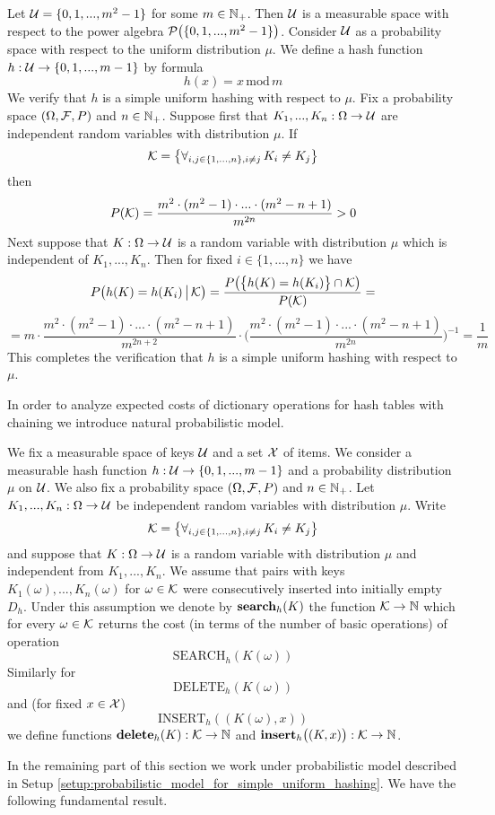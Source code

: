 \begin{example}\label{example:interval_of_integers_with_modulo_hash_function_as_an_example_of_suh}
Let ${\mathcal U} = \{0,1,...,m^2-1\}$ for some $m\in {\mathbb N}_+$. Then ${\mathcal U}$ is a measurable space with respect to the power algebra ${\mathcal P}\big(\{0,1,...,m^2-1\}\big)$. Consider ${\mathcal U}$ as a probability space with respect to the uniform distribution $\mu$. We define a hash function $h:{\mathcal U} \rightarrow \{0,1,...,m-1\}$ by formula
$$h(x) = x\,\mathrm{mod}\,m$$
We verify that $h$ is a simple uniform hashing with respect to $\mu$. Fix a probability space $(\Omega,{\mathcal F},P)$ and $n\in {\mathbb N}_+$. Suppose first that $K_1,...,K_n:\Omega\rightarrow {\mathcal U}$ are independent random variables with distribution $\mu$. If 
$${\mathcal K} =\big\{\forall_{i,j\in \{1,...,n\},i\neq j}\,K_i\neq K_j\big\}$$
then
$$P({\mathcal K}) = \frac{m^2 \cdot (m^2 - 1) \cdot ... \cdot (m^2 - n + 1)}{m^{2n}} > 0$$
Next suppose that $K:\Omega\rightarrow {\mathcal U}$ is a random variable with distribution $\mu$ which is independent of $K_1,...,K_n$. Then for fixed $i\in \{1,...,n\}$ we have 
$$P\big(h(K) = h(K_i)\,\big|\,{\mathcal K}\big) = \frac{P\big(\big\{h(K) = h(K_i) \big\}\cap {\mathcal K}\big)}{P({\mathcal K})} =$$
$$= m\cdot \frac{m^2 \cdot (m^2 - 1)\cdot ... \cdot (m^2 - n + 1)}{ m^{2n+2}} \cdot \bigg(\frac{m^2 \cdot (m^2 - 1) \cdot ... \cdot (m^2 - n + 1)}{m^{2n}}\bigg)^{-1} =  \frac{1}{m}$$
This completes the verification that $h$ is a simple uniform hashing with respect to $\mu$.
\end{example}
\noindent
In order to analyze expected costs of dictionary operations for hash tables with chaining we introduce natural probabilistic model. 

\begin{setup}\label{setup:probabilistic_model_for_simple_uniform_hashing}
We fix a measurable space of keys ${\mathcal U}$ and a set ${\mathcal X}$ of items. We consider a measurable hash function $h:{\mathcal U}\rightarrow \{0,1,...,m-1\}$ and a probability distribution $\mu$ on ${\mathcal U}$. We also fix a probability space $(\Omega,{\mathcal F},P)$ and $n\in {\mathbb N}_+$. Let $K_1,...,K_n:\Omega \rightarrow {\mathcal U}$ be independent random variables with distribution $\mu$. Write
$${\mathcal K} = \big\{\forall_{i,j\in \{1,...,n\},i\neq j}\,K_i\neq K_j\big\}$$
and suppose that $K:\Omega\rightarrow {\mathcal U}$ is a random variable with distribution $\mu$ and independent from $K_1,...,K_n$. We assume that pairs with keys $K_1(\omega),...,K_n(\omega)$ for $\omega \in {\mathcal K}$ were consecutively inserted into initially empty $D_h$. Under this assumption we denote by $\mathbf{search}_h(K)$ the function ${\mathcal K}\rightarrow {\mathbb N}$ which for every $\omega \in {\mathcal K}$ returns the cost (in terms of the number of basic operations) of operation 
$$\mathrm{SEARCH}_h(K(\omega))$$
Similarly for 
$$\mathrm{DELETE}_h(K(\omega))$$ 
and (for fixed $x\in {\mathcal X}$)
$$\mathrm{INSERT}_h\left((K(\omega),x)\right)$$
we define functions $\mathbf{delete}_h(K):{\mathcal K}\rightarrow {\mathbb N}$ and $\mathbf{insert}_h\big((K,x)\big):{\mathcal K}\rightarrow {\mathbb N}$.
\end{setup}
\noindent
In the remaining part of this section we work under probabilistic model described in Setup \ref{setup:probabilistic_model_for_simple_uniform_hashing}. We have the following fundamental result.

